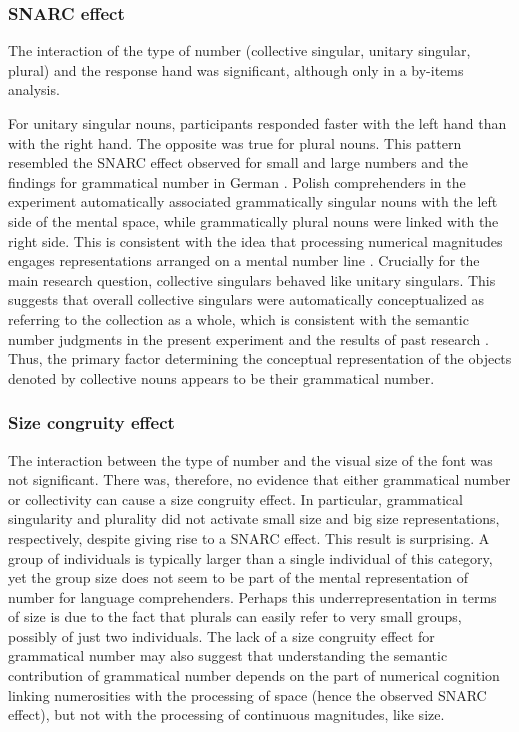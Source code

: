 \documentclass[output=paper]{langscibook}
\begin{document}
\subsubsection{SNARC effect}
The interaction of the type of number (collective singular, unitary singular, plural) and the response hand was significant, although only in a by-items analysis.

For unitary singular nouns, participants responded faster with the left hand than with the right hand. The opposite was true for plural nouns. This pattern resembled the SNARC effect observed for small and large numbers \citep{dehaeneMentalRepresentationParity1993,geversNumbersSpaceComputational2006,gobelCulturalNumberLine2011} and the findings for grammatical number in German \citep{rottgerGrammaticalNumberElicits2015}. Polish comprehenders in the experiment automatically associated grammatically singular nouns with the left side of the mental space, while grammatically plural nouns were linked with the right side. This is consistent with the idea that processing numerical magnitudes engages representations arranged on a mental number line \citep{dehaeneMentalRepresentationParity1993,gobelCulturalNumberLine2011,paveseSymbolicDistanceNumerosity1998}. Crucially for the main research question, collective singulars behaved like unitary singulars. This suggests that overall collective singulars were automatically conceptualized as referring to the collection as a whole, which is consistent with the semantic number judgments in the present experiment and the results of past research  \citep{bockMeaningSoundSyntax1993, nenonenMismatchesGrammaticalNumber2010, bockNumberAgreementBritish2006}. Thus, the primary factor determining the conceptual representation of the objects denoted by collective nouns appears to be their grammatical number.

\subsubsection{Size congruity effect}
The interaction between the type of number and the visual size of the font was not significant. There was, therefore, no evidence that either grammatical number or collectivity can cause a size congruity effect. In particular, grammatical singularity and plurality did not activate small size and big size representations, respectively, despite giving rise to a SNARC effect. This result is surprising. A group of individuals is typically larger than a single individual of this category, yet the group size does not seem to be part of the mental representation of number for language comprehenders. Perhaps this underrepresentation in terms of size is due to the fact that plurals can easily refer to very small groups, possibly of just two individuals. The lack of a size congruity effect for grammatical number may also suggest that understanding the semantic contribution of grammatical number depends on the part of numerical cognition linking numerosities with the processing of space (hence the observed SNARC effect), but not with the processing of continuous magnitudes, like size.
\end{document}
